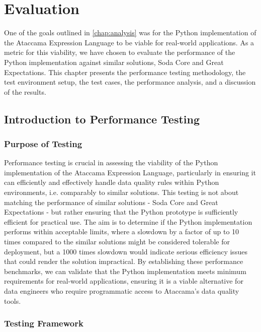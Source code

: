 
\chapter{Evaluation}
\label{chap:evaluation}

One of the goals outlined in \autoref{chap:analysis} was for the Python implementation of the Ataccama Expression Language to be viable for real-world applications. As a metric for this viability, we have chosen to evaluate the performance of the Python implementation against similar solutions, Soda Core and Great Expectations. This chapter presents the performance testing methodology, the test environment setup, the test cases, the performance analysis, and a discussion of the results.

\section{Introduction to Performance Testing}

\subsection{Purpose of Testing}

Performance testing is crucial in assessing the viability of the Python implementation of the Ataccama Expression Language, particularly in ensuring it can efficiently and effectively handle data quality rules within Python environments, i.e. comparably to similar solutions. This testing is not about matching the performance of similar solutions - Soda Core and Great Expectations -  but rather ensuring that the Python prototype is sufficiently efficient for practical use. The aim is to determine if the Python implementation performs within acceptable limits, where a slowdown by a factor of up to 10 times compared to the similar solutions might be considered tolerable for deployment, but a 1000 times slowdown would indicate serious efficiency issues that could render the solution impractical. By establishing these performance benchmarks, we can validate that the Python implementation meets minimum requirements for real-world applications, ensuring it is a viable alternative for data engineers who require programmatic access to Ataccama's data quality tools.

\subsection{Testing Framework}

